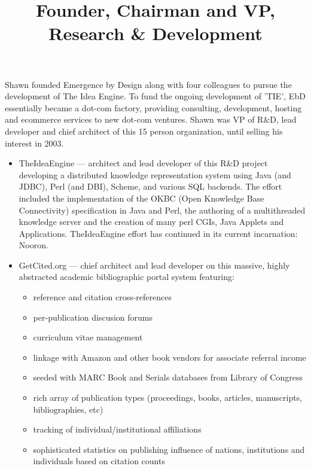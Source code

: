 \begin{resume}
\begin{position}
\begin{itemize}

\end{itemize}

\end{position}




\title{ Founder, Chairman and VP, Research \& Development }

\begin{position}
  Shawn founded Emergence by Design along with four colleagues to pursue
  the development of The Idea Engine.  To fund the ongoing development of
  'TIE', EbD essentially became a dot-com factory, providing consulting,
  development, hosting and ecommerce services to new dot-com ventures.
  Shawn was VP of R\&D, lead developer and chief architect of this 15 person
  organization, until selling his interest in 2003.

\begin{itemize}

\item TheIdeaEngine --- architect and lead developer of this R\&D project developing a distributed
  knowledge representation system using Java (and JDBC), Perl (and DBI), Scheme, and various SQL backends.  
  The effort included the
  implementation of the OKBC (Open Knowledge Base Connectivity)
  specification in Java and Perl,
  the authoring of a multithreaded knowledge server
  and the creation of many perl CGIs, Java Applets and Applications.
  TheIdeaEngine effort has continued in its current incarnation: Nooron.

\item GetCited.org --- chief architect and lead developer on
  this massive, highly abstracted academic bibliographic portal system featuring:
  \begin{itemize}
    \item reference and citation cross-references
    \item per-publication discusion forums
    \item curriculum vitae management
    \item linkage with Amazon and other book vendors for associate
    referral income
    \item seeded with MARC Book and Serials databases from Library of Congress
    \item rich array of publication types (proceedings, books, articles,
       manuscripts, bibliographies, etc)
    \item tracking of individual/institutional affiliations
    \item sophisticated statistics on publishing influence of
       nations, institutions and individuals based on citation counts
  \end{itemize}    


\end{itemize}
\end{position}
\end{resume}
